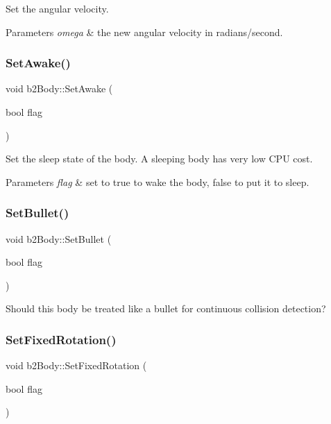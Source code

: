 Set the angular velocity. 
\begin{DoxyParams}{Parameters}
{\em omega} & the new angular velocity in radians/second. \\
\hline
\end{DoxyParams}
\mbox{\label{classb2_body_ac72ed3df52a26c33db82252ab57399af}} 
\subsubsection{\texorpdfstring{SetAwake()}{SetAwake()}}
{\footnotesize\ttfamily void b2\+Body\+::\+Set\+Awake (\begin{DoxyParamCaption}\item[{bool}]{flag }\end{DoxyParamCaption})\hspace{0.3cm}{\ttfamily [inline]}}

Set the sleep state of the body. A sleeping body has very low C\+PU cost. 
\begin{DoxyParams}{Parameters}
{\em flag} & set to true to wake the body, false to put it to sleep. \\
\hline
\end{DoxyParams}
\mbox{\label{classb2_body_a3253af3725b8d6d63d8223bcd2ddab5c}} 
\subsubsection{\texorpdfstring{SetBullet()}{SetBullet()}}
{\footnotesize\ttfamily void b2\+Body\+::\+Set\+Bullet (\begin{DoxyParamCaption}\item[{bool}]{flag }\end{DoxyParamCaption})\hspace{0.3cm}{\ttfamily [inline]}}



Should this body be treated like a bullet for continuous collision detection? 

\mbox{\label{classb2_body_aff35078e2a221d2d05409674936cb8d2}} 
\subsubsection{\texorpdfstring{SetFixedRotation()}{SetFixedRotation()}}
{\footnotesize\ttfamily void b2\+Body\+::\+Set\+Fixed\+Rotation (\begin{DoxyParamCaption}\item[{bool}]{flag }\end{DoxyParamCaption})}


